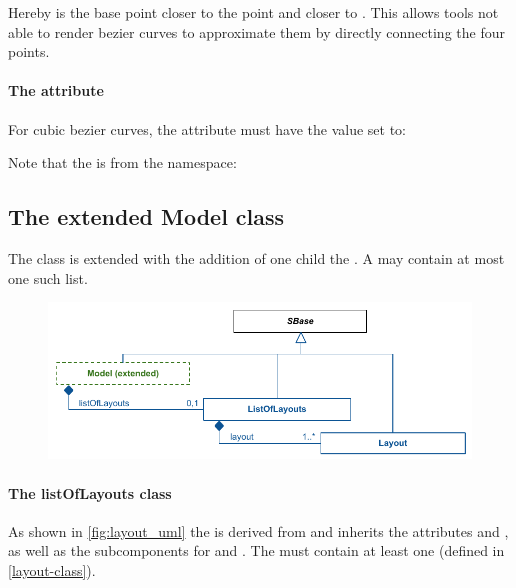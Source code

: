 Hereby  is the base point closer to the  
point and  closer to . This allows tools not able to render bezier curves to approximate them by directly connecting the four points. 


\paragraph {The  attribute} For cubic bezier curves, the 
attribute  must have the value set to: 


\begin{center}
\end{center}

Note that the  is from the  namespace: 

\begin{center}
\end{center}

\subsection{The extended Model class}
\label{model-class}

The \SBML \Model class is extended with the addition of one child the 
. A \Model may contain at most one such list. 


\begin{figure}[!h]
\includegraphics{uml/layout-extended-model-uml}\\
\label{uml:extendedmodel}
\end{figure}

\paragraph{The listOfLayouts class}
\label{listoflayouts-class}
As shown in \ref{fig:layout_uml} the \ListOfLayouts is derived from 
\SBase and inherits the attributes  and , 
as well as the subcomponents for \Annotation and \Notes. The 
\ListOfLayouts must contain at least one \Layout (defined in 
\ref{layout-class}). 


